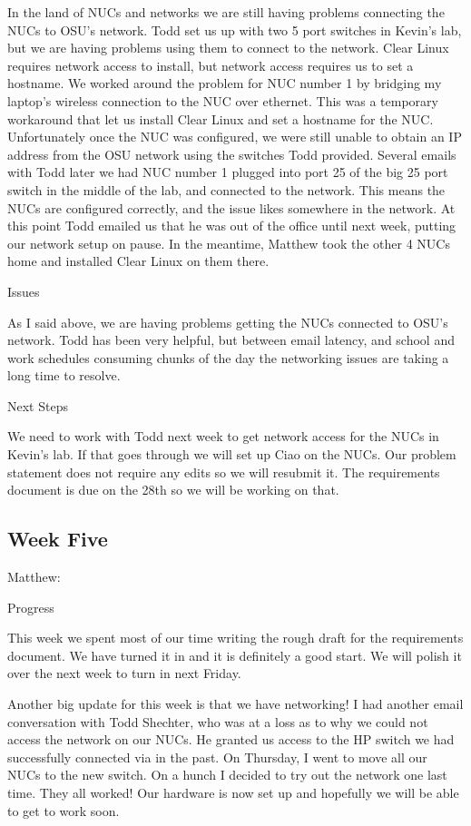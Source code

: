 \documentclass[10pt,onecolumn,journal,draftclsnofoot]{IEEEtran}
\begin{document}
In the land of NUCs and networks we are still having problems connecting the
NUCs to OSU's network. Todd set us up with two 5 port switches in Kevin's lab,
but we are having problems using them to connect to the network. Clear Linux
requires network access to install, but network access requires us to set a
hostname. We worked around the problem for NUC number 1 by bridging my laptop's
wireless connection to the NUC over ethernet. This was a temporary workaround
that let us install Clear Linux and set a hostname for the NUC. Unfortunately
once the NUC was configured, we were still unable to obtain an IP address from
the OSU network using the switches Todd provided. Several emails with Todd later
we had NUC number 1 plugged into port 25 of the big 25 port switch in the middle
of the lab, and connected to the network. This means the NUCs are configured
correctly, and the issue likes somewhere in the network. At this point Todd
emailed us that he was out of the office until next week, putting our network
setup on pause. In the meantime, Matthew took the other 4 NUCs home and
installed Clear Linux on them there.

Issues

As I said above, we are having problems getting the NUCs connected to OSU's
network. Todd has been very helpful, but between email latency, and school and
work schedules consuming chunks of the day the networking issues are taking a
long time to resolve.

Next Steps

We need to work with Todd next week to get network access for the NUCs in
Kevin's lab. If that goes through we will set up Ciao on the NUCs. Our problem
statement does not require any edits so we will resubmit it. The requirements
document is due on the 28th so we will be working on that.

\subsection{Week Five}

Matthew:

Progress

This week we spent most of our time writing the rough draft for the requirements
document. We have turned it in and it is definitely a good start. We will polish
it over the next week to turn in next Friday.

Another big update for this week is that we have networking! I had another email
conversation with Todd Shechter, who was at a loss as to why we could not access
the network on our NUCs. He granted us access to the HP switch we had
successfully connected via in the past. On Thursday, I went to move all our NUCs
to the new switch. On a hunch I decided to try out the network one last time.
They all worked! Our hardware is now set up and hopefully we will be able to get
to work soon.
\end{document}
